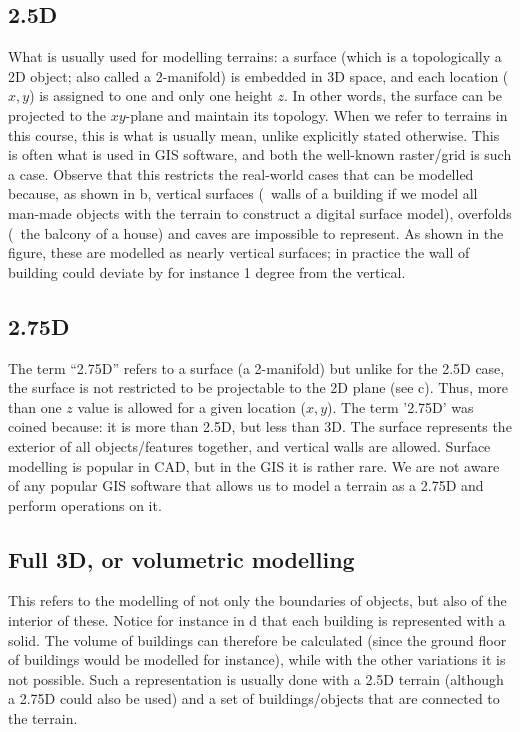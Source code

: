 \subsection{2.5D}%
What is usually used for modelling terrains: a surface (which is a topologically a 2D object; also called a 2-manifold) 
is embedded in 3D space, and each location ($x,y$) is assigned to one and only one height $z$.
In other words, the surface can be projected to the $xy$-plane and maintain its topology.
When we refer to terrains in this course, this is what is usually mean, unlike explicitly stated otherwise.
This is often what is used in GIS software, and both the well-known raster/grid  is such a case.
Observe that this restricts the real-world cases that can be modelled because, as shown in b, vertical surfaces (\eg\ walls of a building if we model all man-made objects with the terrain to construct a digital surface model), overfolds (\eg\ the balcony of a house) and caves are impossible to represent.
As shown in the figure, these are modelled as nearly vertical surfaces; in practice the wall of building could deviate by for instance 1 degree from the vertical. 

\subsection{2.75D}%
The term ``2.75D'' refers to a surface (a 2-manifold) but unlike for the 2.5D case, the surface is not restricted to be projectable to the 2D plane (see c).
Thus, more than one $z$ value is allowed for a given location ($x,y$).
The term '2.75D' was coined because: it is more than 2.5D, but less than 3D.
The surface represents the exterior of all objects/features together, and vertical walls are allowed.
Surface modelling is popular in CAD, but in the GIS it is rather rare.
We are not aware of any popular GIS software that allows us to model a terrain as a 2.75D and perform operations on it.

\subsection[3D]{Full 3D, or volumetric modelling} 
This refers to the modelling of not only the boundaries of objects, but also of the interior of these.
Notice for instance in d that each building is represented with a solid.
The volume of buildings can therefore be calculated (since the ground floor of buildings would be modelled for instance), while with the other variations it is not possible. 
Such a representation is usually done with a 2.5D terrain (although a 2.75D could also be used) and a set of buildings/objects that are connected to the terrain.



